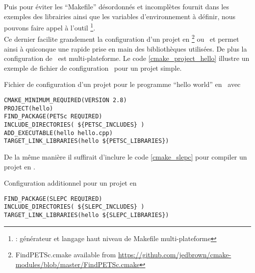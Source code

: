 Puis pour éviter les ``Makefile'' désordonnés et incomplètes fournit dans les exemples des librairies ainsi que les variables d'environnement à définir, nous pouvons faire appel à l'outil \cmake\footnote{\cmake: générateur et langage haut niveau de Makefile multi-plateforme}.\\

Ce dernier facilite grandement la configuration d'un projet en \petsc\footnote{FindPETSc.cmake available from \url{https://github.com/jedbrown/cmake-modules/blob/master/FindPETSc.cmake}} ou \slepc\ et permet ainsi à quiconque une rapide prise en main des bibliothèques utilisées. De plus la configuration de \cmake\ est multi-plateforme. Le code \ref{cmake_project_hello} illustre un exemple de fichier de configuration \cmake\ pour un projet simple.

\begin{algorithm}[h]
  \caption{Fichier de configuration d'un projet pour le programme ``hello world'' en \petsc\ avec \cmake}
  \label{cmake_project_hello}
\begin{verbatim}
CMAKE_MINIMUM_REQUIRED(VERSION 2.8)
PROJECT(hello)
FIND_PACKAGE(PETSc REQUIRED)
INCLUDE_DIRECTORIES( ${PETSC_INCLUDES} )
ADD_EXECUTABLE(hello hello.cpp)
TARGET_LINK_LIBRARIES(hello ${PETSC_LIBRARIES})
\end{verbatim}
\end{algorithm}

De la même manière il suffirait d'inclure le code \ref{cmake_slepc} pour compiler un projet en \slepc.

\begin{algorithm}[h]
  \caption{Configuration additionnel pour un projet en \slepc}
  \label{cmake_slepc}
\begin{verbatim}
FIND_PACKAGE(SLEPC REQUIRED)
INCLUDE_DIRECTORIES( ${SLEPC_INCLUDES} )
TARGET_LINK_LIBRARIES(hello ${SLEPC_LIBRARIES})
\end{verbatim}
\end{algorithm}

